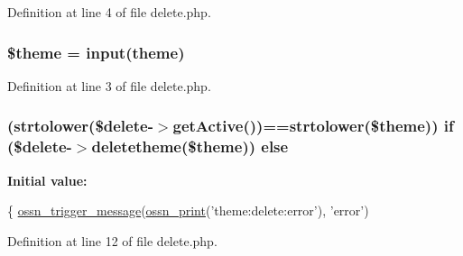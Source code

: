 Definition at line 4 of file delete.\+php.

\subsubsection[{\texorpdfstring{\$theme}{$theme}}]{\setlength{\rightskip}{0pt plus 5cm}\$theme = {\bf input}(\textquotesingle{}theme\textquotesingle{})}\hypertarget{actions_2administrator_2theme_2delete_8php_a1ae541f7fe1c5e21cb4535f88ec9e9dc}{}\label{actions_2administrator_2theme_2delete_8php_a1ae541f7fe1c5e21cb4535f88ec9e9dc}


Definition at line 3 of file delete.\+php.

\subsubsection[{\texorpdfstring{else}{else}}]{ (strtolower(\$delete-\/$>$get\+Active())==strtolower(\$theme)) {\bf if} (\$delete-\/$>$deletetheme(\$theme)) else}\hypertarget{actions_2administrator_2theme_2delete_8php_ab47f7dfb658deaebf366c25c9b36e8c7}{}\label{actions_2administrator_2theme_2delete_8php_ab47f7dfb658deaebf366c25c9b36e8c7}
{\bfseries Initial value\+:}
\begin{DoxyCode}
\{
    \hyperlink{ossn_8lib_8system_8php_ab3f23f23f32f50c12e7aea0ffaccaac7}{ossn\_trigger\_message}(\hyperlink{ossn_8lib_8languages_8php_a2be5d1c4b695593a9b9067b96df2150a}{ossn\_print}(\textcolor{stringliteral}{'theme:delete:error'}), \textcolor{stringliteral}{'error'})
\end{DoxyCode}


Definition at line 12 of file delete.\+php.

